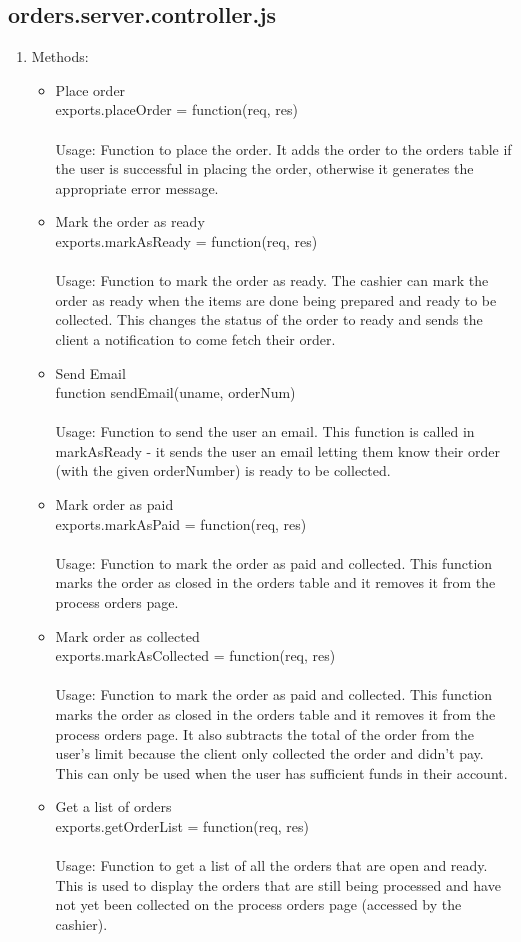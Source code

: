 \documentclass[a4paper,12pt]{report}
\begin{document}
\subsection{orders.server.controller.js}
\begin{enumerate} 
\item Methods:
\begin{itemize}
\item Place order \\ exports.placeOrder = function(req, res) 
\\ \\ Usage: Function to place the order. It adds the order to the orders table if the user is successful in placing the order, otherwise it generates the appropriate error message.
\item Mark the order as ready \\ exports.markAsReady = function(req, res) 
\\ \\ Usage: Function to mark the order as ready. The cashier can mark the order as ready when the items are done being prepared and ready to be collected. This changes the status of the order to ready and sends the client a notification to come fetch their order.
\item Send Email \\ function sendEmail(uname, orderNum) 
\\ \\ Usage: Function to send the user an email. This function is called in markAsReady - it sends the user an email letting them know their order (with the given orderNumber) is ready to be collected.
\item Mark order as paid \\ exports.markAsPaid = function(req, res) 
\\ \\ Usage: Function to mark the order as paid and collected. This function marks the order as closed in the orders table and it removes it from the process orders page.
\item Mark order as collected \\ exports.markAsCollected = function(req, res) 
\\ \\ Usage: Function to mark the order as paid and collected. This function marks the order as closed in the orders table and it removes it from the process orders page. It also subtracts the total of the order from the user's limit because the client only collected the order and didn't pay. This can only be used when the user has sufficient funds in their account.
\item Get a list of orders \\ exports.getOrderList = function(req, res) 
\\ \\ Usage: Function to get a list of all the orders that are open and ready. This is used to display the orders that are still being processed and have not yet been collected on the process orders page (accessed by the cashier).
\end{itemize}
\end{enumerate}
\end{document}

